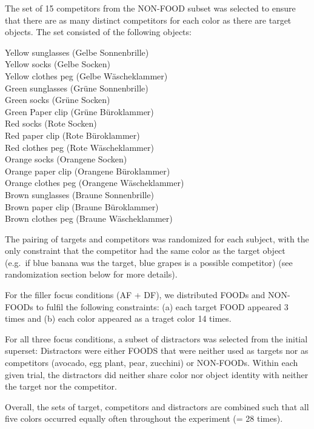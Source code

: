 \documentclass[
]{article}
\begin{document}
The set of 15 competitors from the NON-FOOD subset was selected to
ensure that there are as many distinct competitors for each color as
there are target objects. The set consisted of the following objects:

\noindent Yellow sunglasses (Gelbe Sonnenbrille)\\
\noindent Yellow socks (Gelbe Socken)\\
\noindent Yellow clothes peg (Gelbe Wäscheklammer)\\
\noindent Green sunglasses (Grüne Sonnenbrille)\\
\noindent Green socks (Grüne Socken)\\
\noindent Green Paper clip (Grüne Büroklammer)\\
\noindent Red socks (Rote Socken)\\
\noindent Red paper clip (Rote Büroklammer)\\
\noindent Red clothes peg (Rote Wäscheklammer)\\
\noindent Orange socks (Orangene Socken)\\
\noindent Orange paper clip (Orangene Büroklammer)\\
\noindent Orange clothes peg (Orangene Wäscheklammer)\\
\noindent Brown sunglasses (Braune Sonnenbrille)\\
\noindent Brown paper clip (Braune Büroklammer)\\
\noindent Brown clothes peg (Braune Wäscheklammer)

The pairing of targets and competitors was randomized for each subject,
with the only constraint that the competitor had the same color as the
target object (e.g.~if blue banana was the target, blue grapes is a
possible competitor) (see randomization section below for more details).

For the filler focus conditions (AF + DF), we distributed FOODs and
NON-FOODs to fulfil the following constraints: (a) each target FOOD
appeared 3 times and (b) each color appeared as a traget color 14 times.

For all three focus conditions, a subset of distractors was selected
from the initial superset: Distractors were either FOODS that were
neither used as targets nor as competitors (avocado, egg plant, pear,
zucchini) or NON-FOODs. Within each given trial, the distractors did
neither share color nor object identity with neither the target nor the
competitor.

Overall, the sets of target, competitors and distractors are combined
such that all five colors occurred equally often throughout the
experiment (= 28 times).
\end{document}
